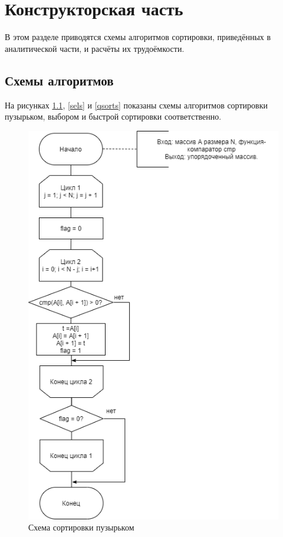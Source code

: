 \documentclass[12pt]{report}
\begin{document}
\chapter{Конструкторская часть}

В этом разделе приводятся схемы алгоритмов сортировки, приведённых в аналитической части, и расчёты их трудоёмкости. 

\section{Схемы алгоритмов}

На рисунках \ref{bubs}, \ref{sels} и \ref{qsorts} показаны схемы алгоритмов сортировки пузырьком, выбором и быстрой сортировки соответственно.

\begin{figure}[h!p]
	\raggedleft
	\includegraphics[scale = 0.58]{bsort.png}
	\caption{Схема сортировки пузырьком}
	\label{bubs}
\end{figure}
\end{document}
